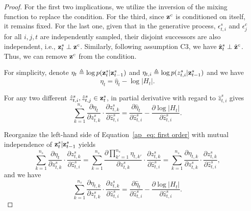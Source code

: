 \begin{proof}
    For the first two implications, we utilize the inversion of the mixing function to replace the condition. For the third, since $ {\mathbf{z}}^c $ is conditioned on itself, it remains fixed. For the last one, given that in the generative process, $ \epsilon_{t,i}^s $ and $ \epsilon_{j}^c $ for all $ i, j, t $ are independently sampled, their disjoint successors are also independent, i.e., $ {\mathbf{z}}_t^s \perp {\mathbf{z}}^c $. Similarly, following assumption C3, we have $ \hat{{\mathbf{z}}}_t^s \perp \hat{{\mathbf{z}}}^c $. Thus, we can remove $ {\mathbf{z}}^c $ from the condition.

    For simplicity, denote $\mathbb{\eta}_{t}\triangleq\log p({\mathbf{z}}^s_{t} | {\mathbf{z}}_{t-1}^s)$ and $\eta_{t,i}\triangleq\log p(z^s_{t,i} | {\mathbf{z}}_{t-1}^s)$ and we have
    \begin{equation}
        \mathbb{\eta}_{t} = \hat{\mathbb{\eta}}_{t} - \log |H_t|. 
    \end{equation}

    For any two different $\hat{z}_{t,i}^s,\hat{z}_{t,j}^s\in{\mathbf{z}}_{t}^s$, in partial derivative with regard to $\hat{z}_{t,i}^s$ gives
    \begin{equation}
    \label{ap_eq: first order}
        \sum_{k=1}^{n_s}
        \frac{\partial \mathbb{\eta}_{t}}{\partial z_{t,k}^s}\cdot
        \frac{\partial z_{t,k}^s}{\partial \hat{z}_{t,i}^s}
        = 
        \frac{\partial \hat{\mathbb{\eta}}_{t}}{\partial \hat{z}_{t,i}^s}
        - 
        \frac{\partial \log |H_t|}{\partial \hat{z}_{t,i}^s}.
    \end{equation}

    Reorganize the left-hand side of Equation~\ref{ap_eq: first order} with mutual independence of ${\mathbf{z}}_t^s|{\mathbf{z}}_{t-1}^s$ yields
    \begin{equation}
        \sum_{k=1}^{n_s}
        \frac{\partial \mathbb{\eta}_{t}}{\partial z_{t,k}^s}\cdot
        \frac{\partial z_{t,k}^s}{\partial \hat{z}_{t,i}^s}
        =
        \sum_{k=1}^{n_s}
        \frac{\partial \prod_{k'=1}^{n_s}\eta_{t,k'}}{\partial z_{t,k}^s}\cdot
        \frac{\partial z_{t,k}^s}{\partial \hat{z}_{t,i}^s}
        =
        \sum_{k=1}^{n_s}
        \frac{\partial \eta_{t,k}}{\partial z_{t,k}^s}\cdot
        \frac{\partial z_{t,k}^s}{\partial \hat{z}_{t,i}^s},
    \end{equation}
    and we have
    \begin{equation}
        \sum_{k=1}^{n_s}
        \frac{\partial \eta_{t,k}}{\partial z_{t,k}^s}\cdot
        \frac{\partial z_{t,k}^s}{\partial \hat{z}_{t,i}^s}
        = 
        \frac{\partial \hat{\mathbb{\eta}}_{t}}{\partial \hat{z}_{t,i}^s}
        - 
        \frac{\partial \log |H_t|}{\partial \hat{z}_{t,i}^s}.
    \end{equation}


\end{proof}
